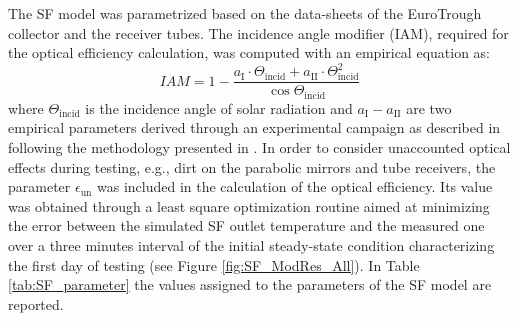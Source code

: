 \documentclass[final,3p,times,review]{elsarticle}
\begin{document}
%
The SF model was parametrized based on the data-sheets of the EuroTrough collector and the receiver tubes. The incidence angle modifier (IAM), required for the optical efficiency calculation, was computed with an empirical equation as:
%
\begin{equation}
IAM = 1 - \frac{a_\mathrm{I} \cdot \Theta_\mathrm{incid} + a_\mathrm{II}\cdot \Theta_\mathrm{incid}^2}{\cos{\Theta_\mathrm{incid}}}
\end{equation} 
%
where $\Theta_\mathrm{incid}$ is the incidence angle of solar radiation and $a_\mathrm{I}-a_\mathrm{II}$ are two empirical parameters derived through an experimental campaign as described in \cite{Sallaberry2016} following the methodology presented in \cite{Valenzuela2014}. In order to consider unaccounted optical effects during testing, e.g., dirt on the parabolic mirrors and tube receivers, the parameter $\epsilon_\mathrm{un}$ was included in the calculation of the optical efficiency. Its value was obtained through a least square optimization routine aimed at minimizing the error between the simulated SF outlet temperature and the measured one over a three minutes interval  of the initial steady-state condition characterizing the first day of testing (see Figure \ref{fig:SF_ModRes_All}). In Table \ref{tab:SF_parameter} the values assigned to the parameters of the SF model are reported.
%
\end{document}

